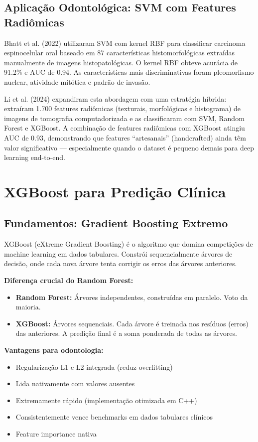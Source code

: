 \subsection{Aplicação Odontológica: SVM com Features Radiômicas}

Bhatt et al. (2022) \cite{ODT-024} utilizaram SVM com kernel RBF para classificar carcinoma espinocelular oral baseado em 87 características histomorfológicas extraídas manualmente de imagens histopatológicas. O kernel RBF obteve acurácia de 91.2\% e AUC de 0.94. As características mais discriminativas foram pleomorfismo nuclear, atividade mitótica e padrão de invasão.

Li et al. (2024) \cite{ODT-028} expandiram esta abordagem com uma estratégia híbrida: extraíram 1.700 features radiômicas (texturais, morfológicas e histograma) de imagens de tomografia computadorizada e as classificaram com SVM, Random Forest e XGBoost. A combinação de features radiômicas com XGBoost atingiu AUC de 0.93, demonstrando que features ``artesanais'' (handcrafted) ainda têm valor significativo — especialmente quando o dataset é pequeno demais para deep learning end-to-end.

\section{XGBoost para Predição Clínica}

\subsection{Fundamentos: Gradient Boosting Extremo}

XGBoost (eXtreme Gradient Boosting)  é o algoritmo que domina competições de machine learning em dados tabulares. Constrói sequencialmente árvores de decisão, onde cada nova árvore tenta corrigir os erros das árvores anteriores.

\textbf{Diferença crucial do Random Forest:}
\begin{itemize}
    \item \textbf{Random Forest:} Árvores independentes, construídas em paralelo. Voto da maioria.
    \item \textbf{XGBoost:} Árvores sequenciais. Cada árvore é treinada nos resíduos (erros) das anteriores. A predição final é a soma ponderada de todas as árvores.
\end{itemize}

\textbf{Vantagens para odontologia:}
\begin{itemize}
    \item Regularização L1 e L2 integrada (reduz overfitting)
    \item Lida nativamente com valores ausentes
    \item Extremamente rápido (implementação otimizada em C++)
    \item Consistentemente vence benchmarks em dados tabulares clínicos
    \item Feature importance nativa
\end{itemize}

